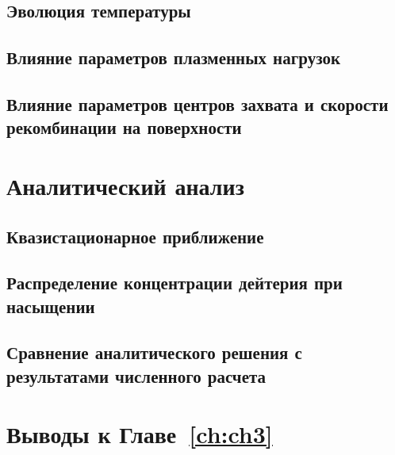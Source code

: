 \subsection{Эволюция температуры}\label{sec:ch3/sec2/subsec2}
\subsection{}\label{sec:ch3/sec2/subsec3}
\subsection{Влияние параметров плазменных нагрузок}\label{sec:ch3/sec2/subsec4}
\subsection{Влияние параметров центров захвата и скорости рекомбинации на поверхности}\label{sec:ch3/sec2/subsec5}


\section{Аналитический анализ}\label{sec:ch3/sec3}
\subsection{Квазистационарное приближение}\label{sec:ch3/sec3/subsec1}
\subsection{Распределение концентрации дейтерия при насыщении}\label{sec:ch3/sec3/subsec2}
\subsection{Сравнение аналитического решения с результатами численного расчета}\label{sec:ch3/sec3/subsec3}

\section{Выводы к Главе~\ref{ch:ch3}}

\clearpage
